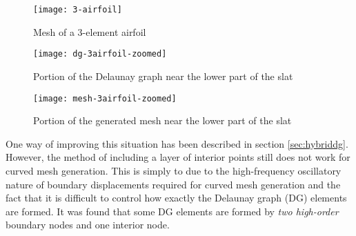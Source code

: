 \begin{figure}[!h]
	\centering
	\texttt{[image: 3-airfoil]}
	\caption{Mesh of a 3-element airfoil}
	\label{fig:wmesh}
\end{figure}
\clearpage
\begin{figure}[p!]
	\centering
	\texttt{[image: dg-3airfoil-zoomed]}
	\caption{Portion of the Delaunay graph near the lower part of the slat}
	\label{fig:wmesh-dg}
\end{figure}
\begin{figure}[p!]
	\centering
	\texttt{[image: mesh-3airfoil-zoomed]}
	\caption{Portion of the generated mesh near the lower part of the slat}
	\label{fig:wmesh-zoomed}
\end{figure}

One way of improving this situation has been described in section \ref{sec:hybriddg}. However, the method of including a layer of interior points still does not work for curved mesh generation. This is simply to due to the high-frequency oscillatory nature of boundary displacements required for curved mesh generation and the fact that it is difficult to control how exactly the Delaunay graph (DG) elements are formed. It was found that some DG elements are formed by \emph{two high-order} boundary nodes and one interior node.
